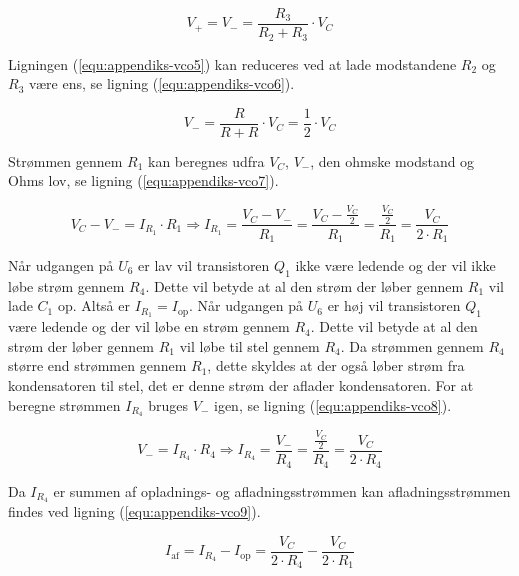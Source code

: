 \begin{equation}
\label{equ:appendiks-vco5}
V_+ = V_- = \frac{R_3}{R_2 + R_3} \cdot V_C
\end{equation}

Ligningen (\ref{equ:appendiks-vco5}) kan reduceres ved at lade modstandene $R_2$ og $R_3$ være ens, se ligning (\ref{equ:appendiks-vco6}).

\begin{equation}
\label{equ:appendiks-vco6}
V_- = \frac{R}{R + R} \cdot V_C = \frac{1}{2} \cdot V_C
\end{equation}

Strømmen gennem $R_1$ kan beregnes udfra $V_C$, $V_-$, den ohmske modstand og Ohms lov, se ligning (\ref{equ:appendiks-vco7}).

\begin{equation}
\label{equ:appendiks-vco7}
V_C - V_- = I_{R_1} \cdot R_1 \Rightarrow I_{R_1} = \frac{V_C - V_-}{R_1} = \frac{V_C - \frac{V_C}{2}}{R_1} = \frac{\frac{V_C}{2}}{R_1} = \frac{V_C}{2 \cdot R_1}
\end{equation}

Når udgangen på $U_6$ er lav vil transistoren $Q_1$ ikke være ledende og der vil ikke løbe strøm gennem $R_4$. Dette vil betyde at al den strøm der løber gennem $R_1$ vil lade $C_1$ op. Altså er $I_{R_1} = I_{\mathrm{op}}$. Når udgangen på $U_6$ er høj vil transistoren $Q_1$ være ledende og der vil løbe en strøm gennem $R_4$. Dette vil betyde at al den strøm der løber gennem $R_1$ vil løbe til stel gennem $R_4$. Da strømmen gennem $R_4$ større end strømmen gennem $R_1$, dette skyldes at der også løber strøm fra kondensatoren til stel, det er denne strøm der aflader kondensatoren. For at beregne strømmen $I_{R_4}$ bruges $V_-$ igen, se ligning (\ref{equ:appendiks-vco8}).

\begin{equation}
\label{equ:appendiks-vco8}
V_- = I_{R_4} \cdot R_4 \Rightarrow I_{R_4} = \frac{V_-}{R_4} = \frac{\frac{V_C}{2}}{R_4} = \frac{V_C}{2 \cdot R_4}
\end{equation}

Da $I_{R_4}$ er summen af opladnings- og afladningsstrømmen kan afladningsstrømmen findes ved ligning (\ref{equ:appendiks-vco9}).

\begin{equation}
\label{equ:appendiks-vco9}
I_{\mathrm{af}} = I_{R_4} - I_{\mathrm{op}} = \frac{V_C}{2 \cdot R_4} - \frac{V_C}{2 \cdot R_1}
\end{equation}

